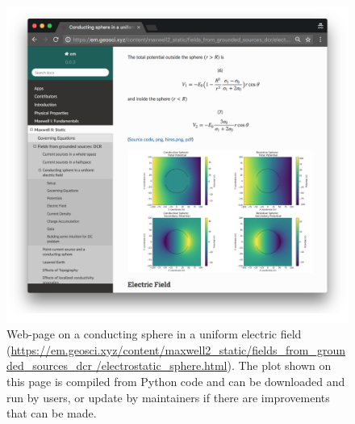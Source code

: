 \begin{figure}
    \begin{center}
    \includegraphics[width=\textwidth]{figures/education/reproducible_figure.png}
    \end{center}
\caption{
    Web-page on a conducting sphere in a uniform electric field
    (\href{https://em.geosci.xyz/content/maxwell2_static/fields_from_grounded_sources_dcr/electrostatic_sphere.html}{https://em.geosci.xyz/content/maxwell2\_static/fields\_from\_grounded\_sources\_dcr /electrostatic\_sphere.html}).
    The plot shown on this page is compiled from Python code and can be downloaded and run by users, or update by maintainers if there are improvements that can be made.
}
\label{fig:reproducible_figure}
\end{figure}



